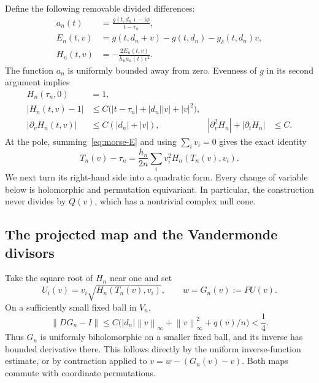 \documentclass[11pt]{article}
\numberwithin{equation}{section}
\theoremstyle{definition}
\newcommand{\ii}{\mathrm i}
\newcommand{\norm}[1]{\left\lVert#1\right\rVert}
\begin{document}
Define the following removable divided differences:
\begin{align}
 a_n(t)&=\frac{g(t,d_n)-\ii\phi}{t-\tau_n},\label{eq:morse-a}\\
 E_n(t,v)&=g(t,d_n+v)-g(t,d_n)-g_\delta(t,d_n)v,\label{eq:morse-E}\\
 H_n(t,v)&=-\frac{2E_n(t,v)}{h_na_n(t)v^2}.
 \label{eq:morse-H}
\end{align}
The function $a_n$ is uniformly bounded away from zero.  Evenness of $g$
in its second argument implies
\begin{align}
 H_n(\tau_n,0)&=1,\label{eq:morse-H-centre}\\
 |H_n(t,v)-1|&\le C\bigl(|t-\tau_n|+|d_n||v|+|v|^2\bigr),
 \label{eq:morse-H-bound}\\
 |\partial_vH_n(t,v)|&\le C(|d_n|+|v|),&
 |\partial_v^2H_n|+|\partial_tH_n|&\le C.
 \label{eq:morse-H-jets}
\end{align}
At the pole, summing~\eqref{eq:morse-E} and using $\sum_i v_i=0$ gives
the exact identity
\begin{equation}
 \boxed{\displaystyle
 T_n(v)-\tau_n=\frac{h_n}{2n}
 \sum_i v_i^2H_n(T_n(v),v_i).}
 \label{eq:morse-energy}
\end{equation}
We next turn its right-hand side into a quadratic form.  Every change of
variable below is holomorphic and permutation equivariant.  In particular,
the construction never divides by $Q(v)$, which has a nontrivial complex
null cone.

\subsection{The projected map and the Vandermonde divisors}

Take the square root of $H_n$ near one and set
\begin{equation}
 U_i(v)=v_i\sqrt{H_n(T_n(v),v_i)},\qquad
 w=G_n(v):=PU(v).
 \label{eq:morse-first-map}
\end{equation}
On a sufficiently small fixed ball in $V_n$,
\begin{equation}
 \norm{DG_n-I}
 \le C\bigl(|d_n|\norm v_\infty+\norm v_\infty^2+q(v)/n\bigr)
 <\frac14.
 \label{eq:morse-first-inverse}
\end{equation}
Thus $G_n$ is uniformly biholomorphic on a smaller fixed ball, and its
inverse has bounded derivative there.  This follows directly by the
uniform inverse-function estimate, or by contraction applied to
$v=w-(G_n(v)-v)$.  Both maps commute with coordinate permutations.
\end{document}
